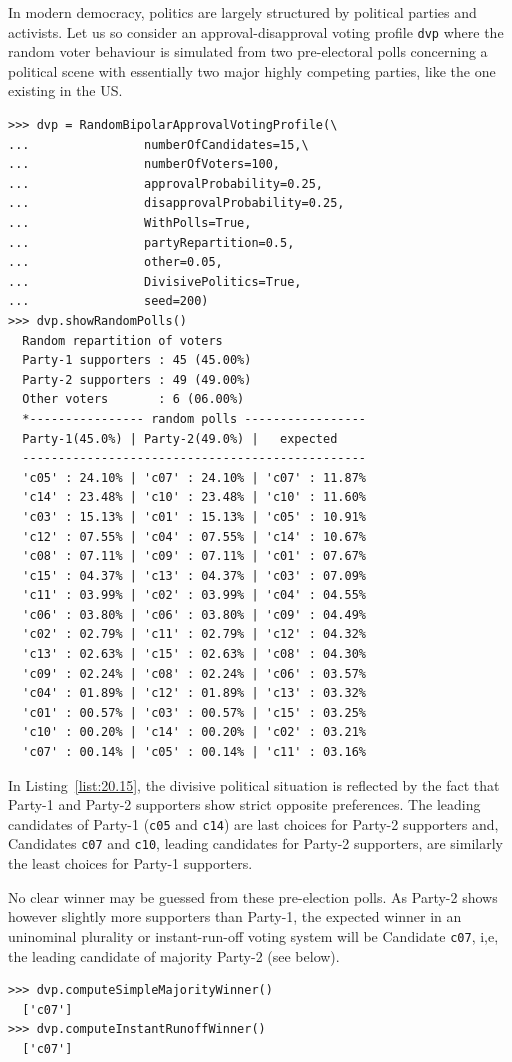 In modern democracy, politics  are largely structured by political parties and activists. Let us so consider an approval-disapproval voting profile \texttt{dvp} where the random voter behaviour is simulated from two pre-electoral polls concerning a political scene with essentially two major highly competing parties, like the one existing in the US.
\begin{lstlisting}[caption={A random approval-disapproval voting profile in a divisive political context},label=list:20.15]
>>> dvp = RandomBipolarApprovalVotingProfile(\
...                numberOfCandidates=15,\
...                numberOfVoters=100,
...                approvalProbability=0.25,
...                disapprovalProbability=0.25,
...                WithPolls=True,
...                partyRepartition=0.5,
...                other=0.05,
...                DivisivePolitics=True,
...                seed=200)
>>> dvp.showRandomPolls()
  Random repartition of voters
  Party-1 supporters : 45 (45.00%)
  Party-2 supporters : 49 (49.00%)
  Other voters       : 6 (06.00%)
  *---------------- random polls -----------------
  Party-1(45.0%) | Party-2(49.0%) |   expected  
  ------------------------------------------------
  'c05' : 24.10% | 'c07' : 24.10% | 'c07' : 11.87%
  'c14' : 23.48% | 'c10' : 23.48% | 'c10' : 11.60%
  'c03' : 15.13% | 'c01' : 15.13% | 'c05' : 10.91%
  'c12' : 07.55% | 'c04' : 07.55% | 'c14' : 10.67%
  'c08' : 07.11% | 'c09' : 07.11% | 'c01' : 07.67%
  'c15' : 04.37% | 'c13' : 04.37% | 'c03' : 07.09%
  'c11' : 03.99% | 'c02' : 03.99% | 'c04' : 04.55%
  'c06' : 03.80% | 'c06' : 03.80% | 'c09' : 04.49%
  'c02' : 02.79% | 'c11' : 02.79% | 'c12' : 04.32%
  'c13' : 02.63% | 'c15' : 02.63% | 'c08' : 04.30%
  'c09' : 02.24% | 'c08' : 02.24% | 'c06' : 03.57%
  'c04' : 01.89% | 'c12' : 01.89% | 'c13' : 03.32%
  'c01' : 00.57% | 'c03' : 00.57% | 'c15' : 03.25%
  'c10' : 00.20% | 'c14' : 00.20% | 'c02' : 03.21%
  'c07' : 00.14% | 'c05' : 00.14% | 'c11' : 03.16%
\end{lstlisting}   

In Listing~\vref{list:20.15}, the divisive political situation is reflected by the fact that Party-1 and Party-2 supporters show strict opposite preferences. The leading candidates of Party-1 (\texttt{c05} and \texttt{c14}) are last choices for Party-2 supporters and, Candidates \texttt{c07} and \texttt{c10}, leading candidates for Party-2 supporters, are similarly the least choices for Party-1 supporters.

No clear winner may be guessed from these pre-election polls. As Party-2 shows however slightly more supporters than Party-1, the expected winner in an uninominal plurality or instant-run-off voting system will be Candidate \texttt{c07}, i,e, the leading candidate of majority Party-2 (see below).
\begin{lstlisting}
>>> dvp.computeSimpleMajorityWinner()
  ['c07']
>>> dvp.computeInstantRunoffWinner()
  ['c07']
\end{lstlisting}

